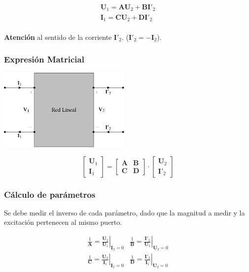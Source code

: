 \[
\begin{array}{l}
  \mathbf{U}_1 = \mathbf{A} \mathbf{U}_2 + \mathbf{B}\mathbf{I'}_2\\
  \mathbf{I}_1 = \mathbf{C} \mathbf{U}_2 + \mathbf{D} \mathbf{I'}_2\\
\end{array}
\]


\textbf{Atención} al sentido de la corriente \(\mathbf{I'}_2\). (\(\mathbf{I'}_2 = - \mathbf{I}_2\)).


\subsubsection{Expresión Matricial}
\label{sec:org104daf9}

\includegraphics[height=4cm]{../figs/cuadripolo_transmision.pdf}


\[
  \left[
    \begin{array}{c}
      \mathbf{U}_1\\
      \mathbf{I}_1
    \end{array}
  \right] =
  \left[
    \begin{array}{cc}
      \mathbf{A} & \mathbf{B}\\
      \mathbf{C} & \mathbf{D}
    \end{array}
  \right] \cdot
  \left[
    \begin{array}{c}
      \mathbf{U}_2\\
      \mathbf{I'}_2
    \end{array}
  \right]
\]

\subsubsection{Cálculo de parámetros}
\label{sec:org99ce061}

Se debe medir el inverso de cada parámetro, dado que la magnitud a medir y la excitación pertenecen al mismo puerto.

\renewcommand{\arraystretch}{3}
\[
  \begin{array}{cc}
    \frac{1}{\mathbf{A}} = \left.\frac{\mathbf{U}_2}{\mathbf{U}_1}\right\rvert_{\mathbf{I}_2 = 0} &
    \frac{1}{\mathbf{B}} = \left.\frac{\mathbf{I'}_2}{\mathbf{U}_1}\right\rvert_{\mathbf{U}_2 = 0}\\
    \frac{1}{\mathbf{C}} = \left.\frac{\mathbf{U}_2}{\mathbf{I}_1}\right\rvert_{\mathbf{I}_2 = 0} &
    \frac{1}{\mathbf{D}} = \left.\frac{\mathbf{I'}_2}{\mathbf{I}_1}\right\rvert_{\mathbf{U}_2 = 0}\\
  \end{array}
\]

